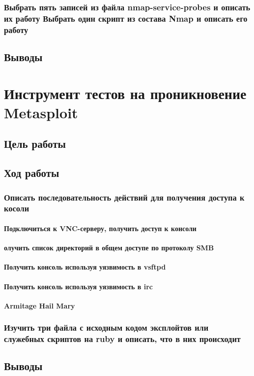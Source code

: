 \documentclass[a4paper, 12pt]{article}		%
\begin{document}
\subsubsection{Выбрать пять записей из файла nmap-service-probes и описать их работу Выбрать один скрипт из состава Nmap и описать его работу}

\subsection{Выводы}


\newpage
\section{Инструмент тестов на проникновение Metasploit}

\subsection{Цель работы}

\subsection{Ход работы}

\subsubsection{Описать последовательность действий для получения доступа к косоли}

\paragraph{Подключиться к VNC-серверу, получить доступ к консоли}

\paragraph{олучить список директорий в общем доступе по протоколу SMB}

\paragraph{Получить консоль используя уязвимость в vsftpd}

\paragraph{Получить консоль используя уязвимость в irc}

\paragraph{Armitage Hail Mary}

\subsubsection{Изучить три файла с исходным кодом эксплойтов или служебных скриптов на ruby и описать, что в них происходит}

\subsection{Выводы}
\end{document}
